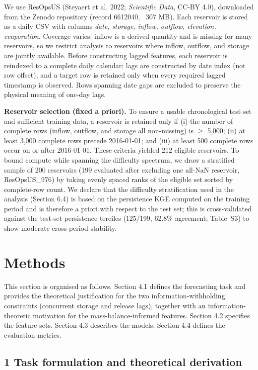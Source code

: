 \documentclass[journal]{ascelike-new}
\begin{document}
We use ResOpsUS (Steyaert et al. 2022; \emph{Scientific Data}, CC-BY 4.0), downloaded from the Zenodo repository (record 6612040, ~307 MB). Each reservoir is stored as a daily CSV with columns \emph{date, storage, inflow, outflow, elevation, evaporation}. Coverage varies: inflow is a derived quantity and is missing for many reservoirs, so we restrict analysis to reservoirs where inflow, outflow, and storage are jointly available. Before constructing lagged features, each reservoir is reindexed to a complete daily calendar; lags are constructed by date index (not row offset), and a target row is retained only when every required lagged timestamp is observed. Rows spanning date gaps are excluded to preserve the physical meaning of one-day lags.


\textbf{Reservoir selection (fixed a priori).} To ensure a usable chronological test set and sufficient training data, a reservoir is retained only if (i) the number of complete rows (inflow, outflow, and storage all non-missing) is $\geq$ 5,000; (ii) at least 3,000 complete rows precede 2016-01-01; and (iii) at least 500 complete rows occur on or after 2016-01-01. These criteria yielded 212 eligible reservoirs. To bound compute while spanning the difficulty spectrum, we draw a stratified sample of 200 reservoirs (199 evaluated after excluding one all-NaN reservoir, ResOpsUS\_976) by taking evenly spaced ranks of the eligible set sorted by complete-row count. We declare that the difficulty stratification used in the analysis (Section 6.4) is based on the persistence KGE computed on the training period and is therefore a priori with respect to the test set; this is cross-validated against the test-set persistence terciles (125/199, 62.8\% agreement; Table~S3) to show moderate cross-period stability.



\section{Methods}


This section is organised as follows. Section 4.1 defines the forecasting task and provides the theoretical justification for the two information-withholding constraints (concurrent storage and release lags), together with an information-theoretic motivation for the mass-balance-informed features. Section 4.2 specifies the feature sets. Section 4.3 describes the models. Section 4.4 defines the evaluation metrics.


\subsection{1 Task formulation and theoretical derivation}
\end{document}
